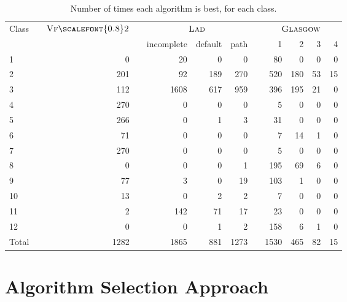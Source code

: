 \documentclass{llncs}
\newcommand{\VFtwo}{$\textsc{Vf{\scalefont{0.8}2}}$\xspace}
\newcommand{\Glasgow}{$\textsc{Glasgow}$\xspace}
\newcommand{\LAD}{$\textsc{Lad}$\xspace}
\begin{document}
\begin{table}[t]
\begin{center}
\begin{tabularx}{.8\textwidth}{XXrXrrrXrrrr}
\toprule
Class && \VFtwo && \multicolumn{3}{c}{\LAD} && \multicolumn{4}{c}{\hspace*{2em}\Glasgow}\\
&&&&incomplete&default&path&&1&2&3&4\\
\midrule
1 &&        0 &&       20 &        0 &        0 &&       80 &        0 &        0 &        0 \\
2 &&      201 &&       92 &      189 &      270 &&      520 &      180 &       53 &       15 \\
3 &&      112 &&     1608 &      617 &      959 &&      396 &      195 &       21 &        0 \\
4 &&      270 &&        0 &        0 &        0 &&        5 &        0 &        0 &        0 \\
5 &&      266 &&        0 &        1 &        3 &&       31 &        0 &        0 &        0 \\
6 &&       71 &&        0 &        0 &        0 &&        7 &       14 &        1 &        0 \\
7 &&      270 &&        0 &        0 &        0 &&        5 &        0 &        0 &        0 \\
8 &&        0 &&        0 &        0 &        1 &&      195 &       69 &        6 &        0 \\
9 &&       77 &&        3 &        0 &       19 &&      103 &        1 &        0 &        0 \\
10 &&       13 &&        0 &        2 &        2 &&        7 &        0 &        0 &        0 \\
11 &&        2 &&      142 &       71 &       17 &&       23 &        0 &        0 &        0 \\
12 &&        0 &&        0 &        1 &        2 &&      158 &        6 &        1 &        0 \\
\midrule
Total && 1282 && 1865 & 881 & 1273 && 1530 & 465 & 82& 15\\
\bottomrule
\end{tabularx}
\end{center}
\caption{Number of times each algorithm is best, for each class.\label{expClass}}
\end{table}

\section{Algorithm Selection Approach}
\end{document}
